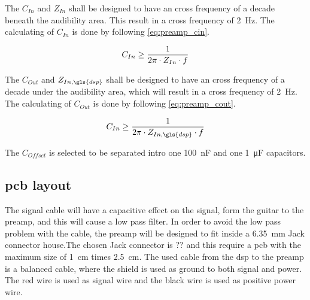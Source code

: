 The $C_{In}$ and $Z_{In}$ shall be designed to have an cross frequency of a decade beneath the audibility area. This result in a cross frequency of \SI{2}{\hertz}. The calculating of $C_{In}$ is done by following \autoref{eq:preamp_cin}.

\begin{equation}\label{eq:preamp_cin}
        C_{In} \geq  \frac{1}{2 \pi \cdot Z_{In} \cdot f}
        \addunit{\si{\farad}}
    \end{equation}

    \startexplain
    \stopexplain
    
    The $C_{Out}$ and $Z_{In,\gls{dsp}}$ shall be designed to have an cross frequency of a decade under the audibility area, which will result in a cross frequency of \SI{2}{\hertz}. The calculating of $C_{Out}$ is done by following \autoref{eq:preamp_cout}.

\begin{equation}\label{eq:preamp_cout}
        C_{In} \geq  \frac{1}{2 \pi \cdot Z_{In,\gls{dsp}} \cdot f}
        \addunit{\si{\farad}}
    \end{equation}

    \startexplain
    \stopexplain
    
 The $C_{Offset}$ is selected to be separated intro one \SI{100}{\nano\farad} and one \SI{1}{\micro\farad} capacitors.
 
\subsection{\gls{pcb} layout} 
The signal cable will have a capacitive effect on the signal, form the guitar to the \gls{preamp}, and this will cause a low pass filter. In order to avoid the low pass problem with the cable, the \gls{preamp} will be designed to fit inside a \SI{6.35}{\milli\meter} Jack connector house.The chosen Jack connector is ?? and this require a \gls{pcb} with the maximum size of  \SI{1}{\centi\meter} times \SI{2.5}{\centi\meter}. The used cable from the \gls{dsp} to the \gls{preamp} is a balanced cable, where the shield is used as ground to both signal and power. The red wire is used as signal wire and the black wire is used as positive power wire.
 
 
 